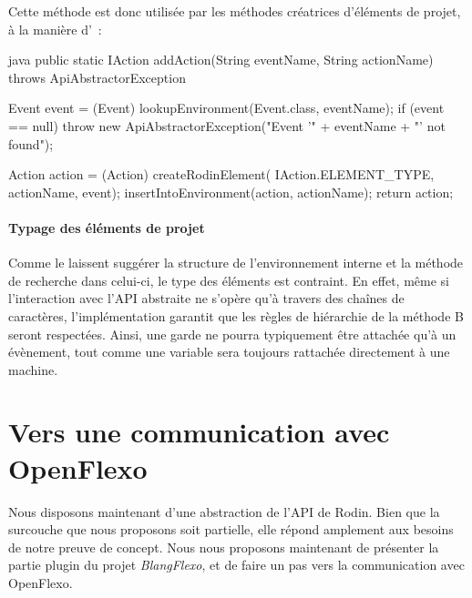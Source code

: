 Cette méthode est donc utilisée par les méthodes créatrices d'éléments de projet, à la manière d'~:

\begin{imtaCode}{java}
public static IAction addAction(String eventName, String actionName) 
    throws ApiAbstractorException 
    {
    Event event = (Event) lookupEnvironment(Event.class, eventName);
    if (event == null)
        throw new ApiAbstractorException("Event '" + eventName + "' not found");

    Action action = (Action) createRodinElement(
                                IAction.ELEMENT_TYPE, actionName, event);
    insertIntoEnvironment(action, actionName);
    return action;
}
\end{imtaCode}


\paragraph{Typage des éléments de projet}

Comme le laissent suggérer la structure de l'environnement interne et la méthode de recherche dans celui-ci, le type des éléments est contraint.
En effet, même si l'interaction avec l'API abstraite ne s'opère qu'à travers des chaînes de caractères, l'implémentation garantit que les règles de hiérarchie de la méthode B seront respectées.
Ainsi, une garde ne pourra typiquement être attachée qu'à un évènement, tout comme une variable sera toujours rattachée directement à une machine.


\section*{Vers une communication avec OpenFlexo}

Nous disposons maintenant d'une abstraction de l'API de Rodin.
Bien que la surcouche que nous proposons soit partielle, elle répond amplement aux besoins de notre preuve de concept.
Nous nous proposons maintenant de présenter la partie plugin du projet \textit{BlangFlexo}, et de faire un pas vers la communication avec OpenFlexo.
